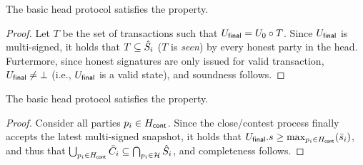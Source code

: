 \begin{lemma}[Soundness]
  \label{lem:soundness}
  The basic head protocol satisfies the  property.
\end{lemma}

\begin{proof}
  Let $T$ be the set of transactions such that $U_{\mathsf{final}}=U_0\circ T$.
  Since $U_{\mathsf{final}}$ is multi-signed, it holds that $T\subseteq\hat{S}_i$
  ($T$ is \emph{seen}) by every honest party in the head.
  Furtermore, since honest signatures are only issued for valid transaction,
  $U_{\mathsf{final}}\not=\bot$ (i.e., $U_{\mathsf{final}}$ is a valid state), and soundness
  follows.
\end{proof}


\begin{lemma}[Completeness]
 \label{lem:completeness}
 The basic head protocol satisfies the 
 property.
\end{lemma}
\begin{proof}
  Consider all parties $p_i\in H_{\mathsf{cont}}$. Since the close/contest process
  finally accepts the latest multi-signed snapshot, it holds that
  $U_{\mathsf{final}}.s \geq \max_{p_i\in H_{\mathsf{cont}}}(\bar s_i)$, and thus that
  $\bigcup_{p_i\in H_{\mathsf{cont}}}\bar{C}_i\subseteq\bigcap_{p_i\in\mathcal H}\hat{S}_i$,
  and completeness follows.
\end{proof}

